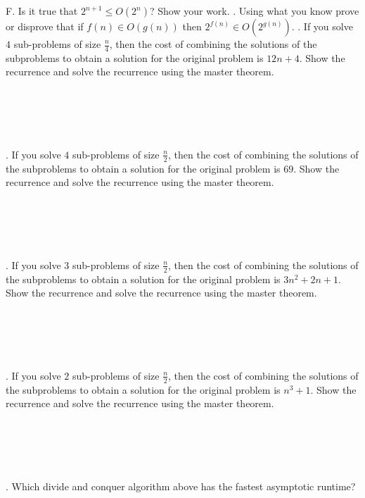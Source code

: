 \documentclass[12pt]{article}
\begin{document}
\noindent F. Is it true that $2^{n+1} \leq O(2^n)$? Show your work.
\newpage 
{}. Using what you know prove or disprove that if $f(n) \in O(g(n))$ then $2^{f(n)}\in O(2^{g(n)})$.
\newpage
{}. If you solve $4$ sub-problems of size $\frac{n}{4}$, then the cost of combining the solutions of the subproblems to obtain a solution for the original problem is $12n+4$. Show the recurrence and solve the recurrence using the master theorem.\\\\\\\\\\\\
. If you solve $4$ sub-problems of size $\frac{n}{2}$, then the cost of combining the solutions of the subproblems to obtain a solution for the original problem is $69$. Show the recurrence and solve the recurrence using the master theorem.\\\\\\\\\\\\
. If you solve $3$ sub-problems of size $\frac{n}{2}$, then the cost of combining the solutions of the subproblems to obtain a solution for the original problem is $3n^2+2n+1$. Show the recurrence and solve the recurrence using the master theorem.\\\\\\\\\\\\
. If you solve $2$ sub-problems of size $\frac{n}{2}$, then the cost of combining the solutions of the subproblems to obtain a solution for the original problem is $n^3+1$. Show the recurrence and solve the recurrence using the master theorem.\\\\\\\\\\\\
. Which divide and conquer algorithm above has the fastest asymptotic runtime?
\end{document}
